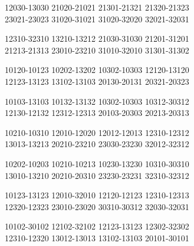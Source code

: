 \begingroup\footnotesize\ttfamily\begin{flushleft}
12030-13030 21020-21021 21301-21321 21320-21323\\
23021-23023 31020-31021 31020-32020 32021-32031\\
\end{flushleft}\endgroup
\begingroup\footnotesize\ttfamily\begin{flushleft}
12310-32310 13210-13212 21030-31030 21201-31201\\
21213-21313 23010-23210 31010-32010 31301-31302\\
\end{flushleft}\endgroup
\begingroup\footnotesize\ttfamily\begin{flushleft}
10120-10123 10202-13202 10302-10303 12120-13120\\
12123-13123 13102-13103 20130-20131 20321-20323\\
\end{flushleft}\endgroup
\begingroup\footnotesize\ttfamily\begin{flushleft}
10103-13103 10132-13132 10302-10303 10312-30312\\
12130-12132 12312-12313 20103-20303 20213-20313\\
\end{flushleft}\endgroup
\begingroup\footnotesize\ttfamily\begin{flushleft}
10210-10310 12010-12020 12012-12013 12310-12312\\
13013-13213 20210-23210 23030-23230 32012-32312\\
\end{flushleft}\endgroup
\begingroup\footnotesize\ttfamily\begin{flushleft}
10202-10203 10210-10213 10230-13230 10310-30310\\
13010-13210 20210-20310 23230-23231 32310-32312\\
\end{flushleft}\endgroup
\begingroup\footnotesize\ttfamily\begin{flushleft}
10123-13123 12010-32010 12120-12123 12310-12313\\
12320-12323 23010-23020 30310-30312 32030-32031\\
\end{flushleft}\endgroup
\begingroup\footnotesize\ttfamily\begin{flushleft}
10102-30102 12102-32102 12123-13123 12302-32302\\
12310-12320 13012-13013 13102-13103 20101-30101\\
\end{flushleft}\endgroup
